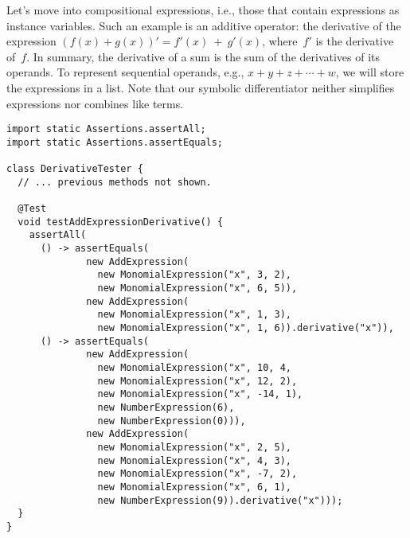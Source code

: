 \newpage %
Let's move into compositional expressions, i.e., those that contain expressions as instance variables. 
Such an example is an additive operator: the derivative of the expression $(f(x) + g(x))' = f'(x)~+~g'(x)$, where~$f'$ is the derivative of~$f$. 
In summary, the derivative of a sum is the sum of the derivatives of its operands. 
To represent sequential operands, e.g., $x + y + z + \cdots + w$, we will store the expressions in a list. 
Note that our symbolic differentiator neither simplifies expressions nor combines like terms.

\begin{lstlisting}[language=MyJava]
import static Assertions.assertAll;
import static Assertions.assertEquals;
  
class DerivativeTester {
  // ... previous methods not shown.

  @Test
  void testAddExpressionDerivative() {
    assertAll(
      () -> assertEquals(
              new AddExpression(
                new MonomialExpression("x", 3, 2),
                new MonomialExpression("x", 6, 5)),
              new AddExpression(
                new MonomialExpression("x", 1, 3),
                new MonomialExpression("x", 1, 6)).derivative("x")),
      () -> assertEquals(
              new AddExpression(
                new MonomialExpression("x", 10, 4,
                new MonomialExpression("x", 12, 2),
                new MonomialExpression("x", -14, 1),
                new NumberExpression(6),
                new NumberExpression(0))),
              new AddExpression(
                new MonomialExpression("x", 2, 5),
                new MonomialExpression("x", 4, 3),
                new MonomialExpression("x", -7, 2),
                new MonomialExpression("x", 6, 1),
                new NumberExpression(9)).derivative("x")));
  }
}
\end{lstlisting}

